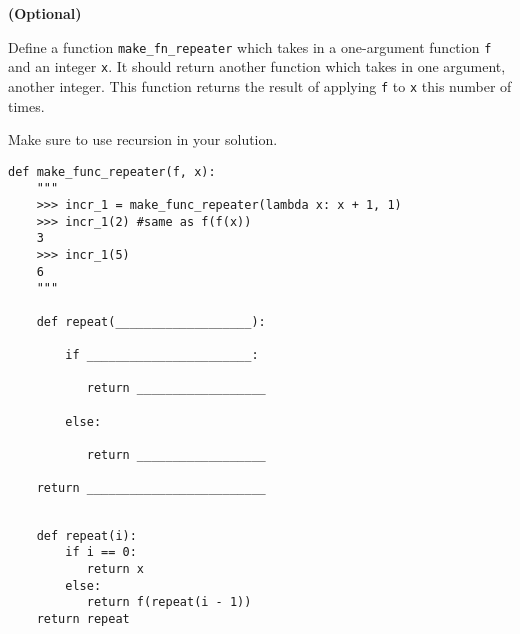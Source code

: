 \question \textbf{(Optional)}

Define a function \texttt{make\_fn\_repeater} which takes in a 
one-argument function \texttt{f} and an integer \texttt{x}. 
It should return another function which takes in one argument, another integer.
This function returns the result of applying \texttt{f} to \texttt{x} this
number of times.

Make sure to use recursion in your solution.

\begin{lstlisting}
def make_func_repeater(f, x):
    """
    >>> incr_1 = make_func_repeater(lambda x: x + 1, 1)
    >>> incr_1(2) #same as f(f(x))
    3
    >>> incr_1(5)
    6
    """

    def repeat(___________________):

        if _______________________:

           return __________________

        else:

           return __________________

    return _________________________


\end{lstlisting}

\begin{solution}[1in]
\begin{lstlisting}
    def repeat(i):
        if i == 0:
           return x
        else:
           return f(repeat(i - 1))
    return repeat
\end{lstlisting}
\end{solution}
